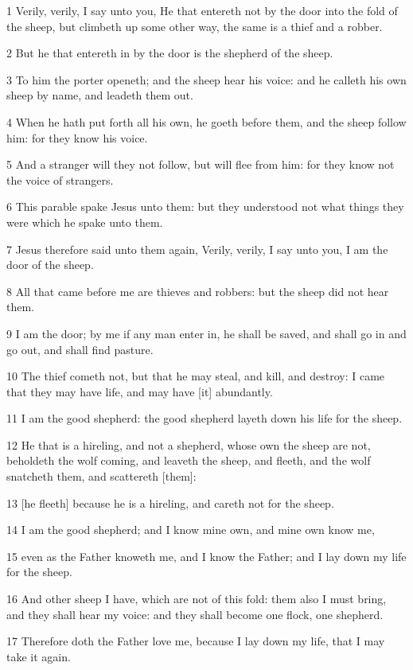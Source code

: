 \par 1 Verily, verily, I say unto you, He that entereth not by the door into the fold of the sheep, but climbeth up some other way, the same is a thief and a robber.
\par 2 But he that entereth in by the door is the shepherd of the sheep.
\par 3 To him the porter openeth; and the sheep hear his voice: and he calleth his own sheep by name, and leadeth them out.
\par 4 When he hath put forth all his own, he goeth before them, and the sheep follow him: for they know his voice.
\par 5 And a stranger will they not follow, but will flee from him: for they know not the voice of strangers.
\par 6 This parable spake Jesus unto them: but they understood not what things they were which he spake unto them.
\par 7 Jesus therefore said unto them again, Verily, verily, I say unto you, I am the door of the sheep.
\par 8 All that came before me are thieves and robbers: but the sheep did not hear them.
\par 9 I am the door; by me if any man enter in, he shall be saved, and shall go in and go out, and shall find pasture.
\par 10 The thief cometh not, but that he may steal, and kill, and destroy: I came that they may have life, and may have [it] abundantly.
\par 11 I am the good shepherd: the good shepherd layeth down his life for the sheep.
\par 12 He that is a hireling, and not a shepherd, whose own the sheep are not, beholdeth the wolf coming, and leaveth the sheep, and fleeth, and the wolf snatcheth them, and scattereth [them]:
\par 13 [he fleeth] because he is a hireling, and careth not for the sheep.
\par 14 I am the good shepherd; and I know mine own, and mine own know me,
\par 15 even as the Father knoweth me, and I know the Father; and I lay down my life for the sheep.
\par 16 And other sheep I have, which are not of this fold: them also I must bring, and they shall hear my voice: and they shall become one flock, one shepherd.
\par 17 Therefore doth the Father love me, because I lay down my life, that I may take it again.
